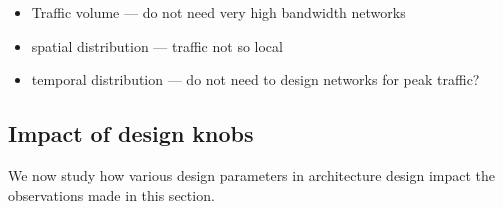 \begin{itemize}[leftmargin=*]
	\itemsep0em
	\item Traffic volume --- do not need very high bandwidth networks
	\item spatial distribution --- traffic not so local
	\item temporal distribution --- do not need to design networks for peak traffic?
\end{itemize}		

\subsection{Impact of design knobs}
\label{ssec:knobs}
We now study how various design parameters in \dis architecture design impact the observations made in this section. 




